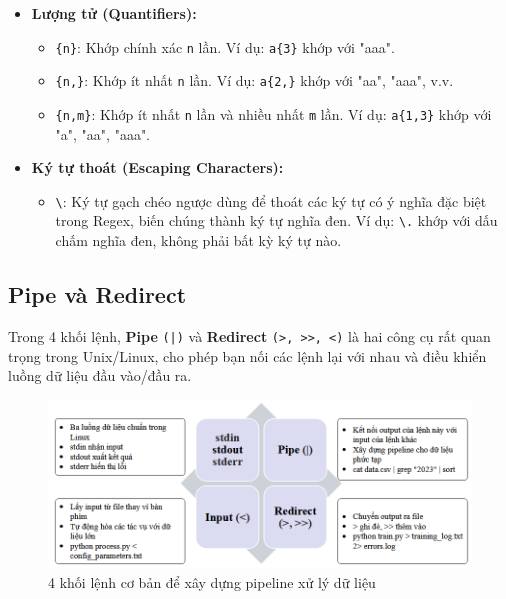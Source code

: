 \documentclass[11pt]{article}
\begin{document}
\begin{itemize}
    \item \textbf{Lượng tử (Quantifiers):}
    \begin{itemize}
        \item  \colorbox{codehighlight} {\texttt{\{n\}}}: Khớp chính xác \texttt{n} lần. Ví dụ: {\texttt{a\{3\}}} khớp với "aaa".
        \item  \colorbox{codehighlight} {\texttt{\{n,\}}}: Khớp ít nhất \texttt{n} lần. Ví dụ: {\texttt{a\{2,\}}} khớp với "aa", "aaa", v.v.
        \item  \colorbox{codehighlight} {\texttt{\{n,m\}}}: Khớp ít nhất \texttt{n} lần và nhiều nhất \texttt{m} lần. Ví dụ: {\texttt{a\{1,3\}}} khớp với "a", "aa", "aaa".
    \end{itemize}

    \item \textbf{Ký tự thoát (Escaping Characters):}
    \begin{itemize}
        \item  \colorbox{codehighlight} {\texttt{\textbackslash}}: Ký tự gạch chéo ngược dùng để thoát các ký tự có ý nghĩa đặc biệt trong Regex, biến chúng thành ký tự nghĩa đen. Ví dụ: {\texttt{\textbackslash.}} khớp với dấu chấm nghĩa đen, không phải bất kỳ ký tự nào.
    \end{itemize}
\end{itemize}

\vspace{4in} %
\subsection{Pipe và Redirect}
Trong 4 khối lệnh, \textbf{Pipe} \texttt{(|)} và \textbf{Redirect} \texttt{(>, >>, <)} là hai công cụ rất quan trọng trong Unix/Linux, cho phép bạn nối các lệnh lại với nhau và điều khiển luồng dữ liệu đầu vào/đầu ra.
\begin{figure}[H]
	\centering
	\includegraphics[width=1 \textwidth]{pipeline_redirect.png}
	\caption{4 khối lệnh cơ bản để xây dựng pipeline xử lý dữ liệu}
	\label{fig:pipeline_redirect}
\end{figure}
\end{document}
